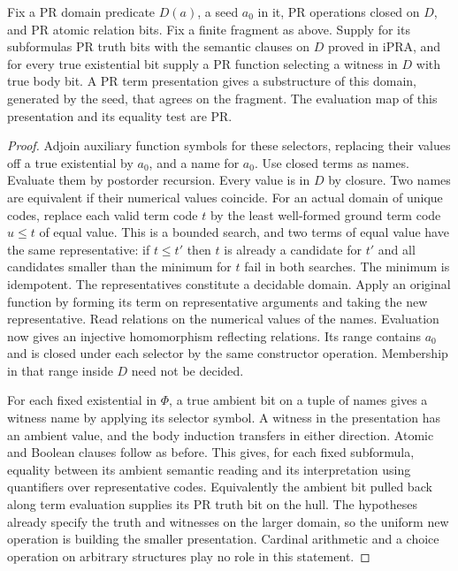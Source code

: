 \begin{proposition}\label{prop:hull}
Fix a PR domain predicate $D(a)$, a seed $a_0$ in it, PR operations closed on $D$, and PR atomic relation bits. Fix a finite fragment as above. Supply for its subformulas PR truth bits with the semantic clauses on $D$ proved in iPRA, and for every true existential bit supply a PR function selecting a witness in $D$ with true body bit. A PR term presentation gives a substructure of this domain, generated by the seed, that agrees on the fragment. The evaluation map of this presentation and its equality test are PR.
\end{proposition}
\begin{proof}
Adjoin auxiliary function symbols for these selectors, replacing their values off a true existential by $a_0$, and a name for $a_0$. Use closed terms as names. Evaluate them by postorder recursion. Every value is in $D$ by closure. Two names are equivalent if their numerical values coincide. For an actual domain of unique codes, replace each valid term code $t$ by the least well-formed ground term code $u\le t$ of equal value. This is a bounded search, and two terms of equal value have the same representative: if $t\le t'$ then $t$ is already a candidate for $t'$ and all candidates smaller than the minimum for $t$ fail in both searches. The minimum is idempotent. The representatives constitute a decidable domain. Apply an original function by forming its term on representative arguments and taking the new representative. Read relations on the numerical values of the names. Evaluation now gives an injective homomorphism reflecting relations. Its range contains $a_0$ and is closed under each selector by the same constructor operation. Membership in that range inside $D$ need not be decided.

For each fixed existential in $\Phi$, a true ambient bit on a tuple of names gives a witness name by applying its selector symbol. A witness in the presentation has an ambient value, and the body induction transfers in either direction. Atomic and Boolean clauses follow as before. This gives, for each fixed subformula, equality between its ambient semantic reading and its interpretation using quantifiers over representative codes. Equivalently the ambient bit pulled back along term evaluation supplies its PR truth bit on the hull. The hypotheses already specify the truth and witnesses on the larger domain, so the uniform new operation is building the smaller presentation. Cardinal arithmetic and a choice operation on arbitrary structures play no role in this statement.
\end{proof}
